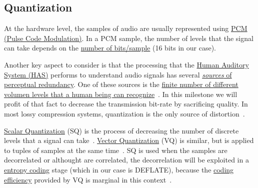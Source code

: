 \subsection{Quantization}
At the hardware level, the samples of audio are usually represented
using \href{https://en.wikipedia.org/wiki/Pulse-code_modulation}{PCM
  (Pulse Code Modulation)}. In a PCM sample, the number of levels that
the signal can take depends on the
\href{https://en.wikipedia.org/wiki/Audio_bit_depth}{number of
  bits/sample} (16 bits in our case).

Another key aspect to consider is that the processing that the
\href{https://en.wikipedia.org/wiki/Auditory_system}{Human Auditory
  System (HAS)} performs to understand audio signals has several
\href{https://en.wikipedia.org/wiki/Psychoacoustics}{\emph{sources} of
  perceptual redundancy}. One of these sources is the
\href{https://en.wikipedia.org/wiki/Equal-loudness_contour}{finite
  number of different volumen levels that a human being can
  recognize}~\cite{bosi2003intro}. In this milestone we will profit of
that fact to decrease the transmission bit-rate by sacrificing
quality.  In most lossy compression systems, quantization is the only
source of distortion~\cite{taubman2002jpeg2000}.

\href{https://en.wikipedia.org/wiki/Quantization_(signal_processing)}{Scalar
  Quantization} (SQ) is the process of decreasing the number of
discrete levels that a signal can
take~\cite{sayood2017introduction}. \href{https://en.wikipedia.org/wiki/Vector_quantization}{Vector
Quantization} (VQ) is similar, but is applied to tuples of samples at
the same time~\cite{vetterli2014foundations}. SQ is used when the
samples are decorrelated or althought are correlated, the decorrelation
will be exploited in
a \href{https://en.wikipedia.org/wiki/Entropy_encoding}{entropy
coding} stage (which in our case is DEFLATE), because the
\href{https://en.wikipedia.org/wiki/Quantization_(signal_processing)#Rate%E2%80%93distortion_optimization}{coding
  efficiency} provided by VQ is marginal in this
context~\cite{vetterli2014foundations}.

